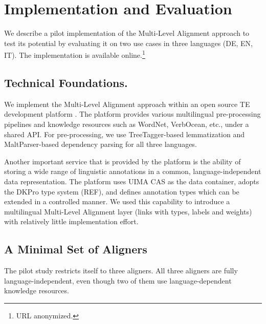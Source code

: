 \documentclass[11pt,letterpaper]{article}
\begin{document}

\section{Implementation and Evaluation}
\label{sec:impl}

We describe a pilot implementation of the Multi-Level Alignment
approach to test its potential by evaluating it on two use cases in
three languages (DE, EN, IT). The implementation is available
online.\footnote{{URL} anonymized.}

\subsection{Technical Foundations.}  
\label{sec:techn-found}

We implement the Multi-Level Alignment approach within an open source
TE development platform \cite{EOP-arch}. The platform provides various
multilingual pre-processing pipelines and knowledge resources such as
WordNet, VerbOcean, etc., under a shared API. For pre-processing, we
use TreeTagger-based lemmatization and MaltParser-based dependency
parsing for all three languages.

Another important service that is provided by the platform is the
ability of storing a wide range of linguistic annotations in a common,
language-independent data representation. The platform uses UIMA CAS
\cite{d04:_uima} as the data container, adopts the DKPro type system
(REF), and defines annotation types which can be extended in a
controlled manner. We used this capability to introduce a multilingual
Multi-Level Alignment layer (links with types, labels and weights)
with relatively little implementation effort.

\subsection{A Minimal Set of Aligners}

The pilot study restricts itself to three aligners.  
%
All three aligners are fully
language-independent, even though two of them use language-dependent
knowledge resources.
\end{document}
